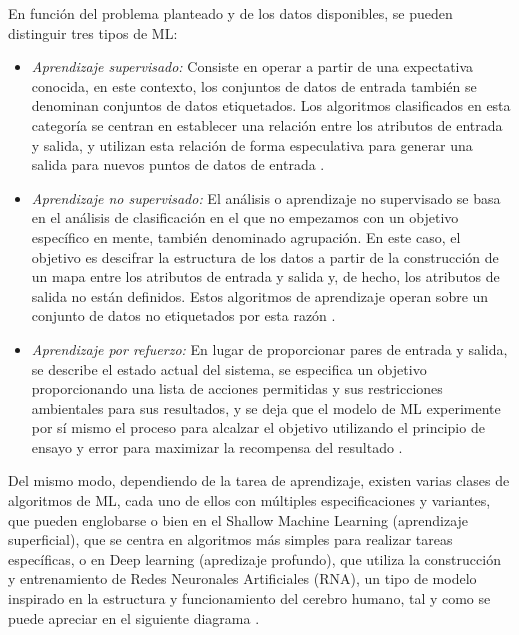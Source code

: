 En función del problema planteado y de los datos disponibles, se pueden distinguir tres tipos de ML:

\begin{itemize}
 \item \textit{Aprendizaje supervisado:} Consiste en operar a partir de una expectativa conocida, en este contexto, los conjuntos de datos de entrada también se denominan conjuntos de datos etiquetados. Los algoritmos clasificados en esta categoría se centran en establecer una relación entre los atributos de entrada y salida, y utilizan esta relación de forma especulativa para generar una salida para nuevos puntos de datos de entrada \cite{Gollapudi16}. 
 
 \item \textit{Aprendizaje no supervisado:} El análisis o aprendizaje no supervisado se basa en el análisis de clasificación en el que no empezamos con un objetivo específico en mente, también denominado agrupación. En este caso, el objetivo es descifrar la estructura de los datos a partir de la construcción de un mapa entre los atributos de entrada y salida y, de hecho, los atributos de salida no están definidos. Estos algoritmos de aprendizaje operan sobre un conjunto de datos no etiquetados por esta razón \cite{Gollapudi16}.
 
 \item \textit{Aprendizaje por refuerzo:} En lugar de proporcionar pares de entrada y salida, se describe el estado actual del sistema, se especifica un objetivo proporcionando una lista de acciones permitidas y sus restricciones ambientales para sus resultados, y se deja que el modelo de ML experimente por sí mismo el proceso para alcalzar el objetivo utilizando el principio de ensayo y error para maximizar la recompensa del resultado \cite{Janiesch21}.
 
\end{itemize}

Del mismo modo, dependiendo de la tarea de aprendizaje, existen varias clases de algoritmos de ML, cada uno de ellos con múltiples especificaciones y variantes, que pueden englobarse o bien en el Shallow Machine Learning (aprendizaje superficial), que se centra en algoritmos más simples para realizar tareas específicas, o en Deep learning (apredizaje profundo), que utiliza la construcción y entrenamiento de Redes Neuronales Artificiales (RNA), un tipo de modelo inspirado en la estructura y funcionamiento del cerebro humano, tal y como se puede apreciar en el siguiente diagrama \cite{Janiesch21}. \\

